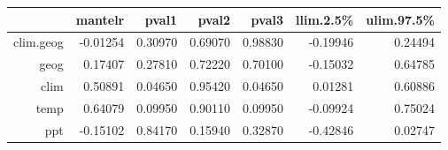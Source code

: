 \begin{table}[ht]
\centering
\begin{tabular}{rrrrrrr}
  \hline
 & mantelr & pval1 & pval2 & pval3 & llim.2.5\% & ulim.97.5\% \\ 
  \hline
clim.geog & -0.01254 & 0.30970 & 0.69070 & 0.98830 & -0.19946 & 0.24494 \\ 
  geog & 0.17407 & 0.27810 & 0.72220 & 0.70100 & -0.15032 & 0.64785 \\ 
  clim & 0.50891 & 0.04650 & 0.95420 & 0.04650 & 0.01281 & 0.60886 \\ 
  temp & 0.64079 & 0.09950 & 0.90110 & 0.09950 & -0.09924 & 0.75024 \\ 
  ppt & -0.15102 & 0.84170 & 0.15940 & 0.32870 & -0.42846 & 0.02747 \\ 
   \hline
\end{tabular}
\end{table}
